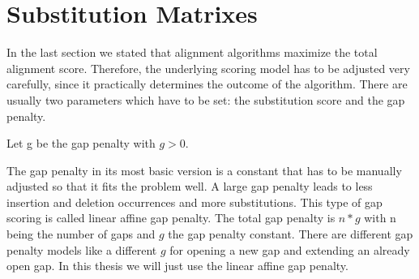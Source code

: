 \section{Substitution Matrixes}
\label{sec:foundationsubstitutionmatrix}
In the last section we stated that alignment algorithms maximize the total alignment score. Therefore, the underlying scoring model has to be adjusted very carefully, since it practically determines the outcome of the algorithm.
There are usually two parameters which have to be set: the substitution score and the gap penalty.

\begin{definition}
	\item Let g be the gap penalty with $g>0$.
	\label{def:gappenalty}
\end{definition}
The gap penalty in its most basic version is a constant that has to be manually adjusted so that it fits the problem well.
A large gap penalty leads to less insertion and deletion occurrences and more substitutions.
This type of gap scoring is called linear affine gap penalty.
The total gap penalty is $n*g$ with n being the number of gaps and $g$ the gap penalty constant.
There are different gap penalty models like a different $g$ for opening a new gap and extending an already open gap.
In this thesis we will just use the linear affine gap penalty.

